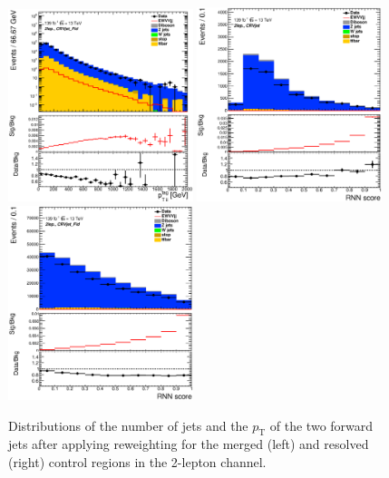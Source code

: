 \begin{figure}[ht]
    \includegraphics[width=0.48\textwidth]{figures/2lep/reweighting/after_reweighting/C_0ptag2pjet_0ptv_CRVjet_Fid_PtTagResJets_Log.eps}
    \includegraphics[width=0.48\textwidth]{figures/2lep/reweighting/after_reweighting/C_0ptag1pfat0pjet_0ptv_CRVjet_RNNScoreMerged_Lin.eps}
    \includegraphics[width=0.48\textwidth]{figures/2lep/reweighting/after_reweighting/C_0ptag2pjet_0ptv_CRVjet_Fid_RNNScoreResolved_Lin.eps}
    \caption{ Distributions of the number of jets and the $p_\mathrm{T}$ of the two forward jets after applying reweighting for the merged (left) and resolved (right) control regions in the 2-lepton channel.}
    \label{fig:after_rw}
\end{figure}
